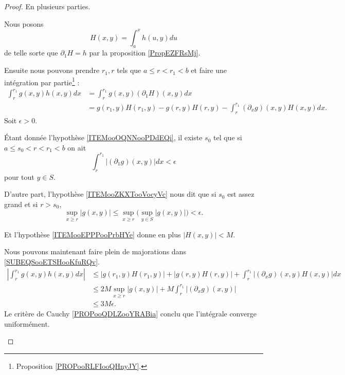 \begin{proof}
	En plusieurs parties.
	\begin{subproof}
		\spitem[La fonction \( H\)]
		Nous posons
		\begin{equation}
			H(x,y)=\int_{a}^xh(u,y)du
		\end{equation}
		de telle sorte que \( \partial_1H=h\) par la proposition \ref{PropEZFRsMj}.

		Ensuite nous pouvons prendre \( r_1,r\) tels que \( a\leq r<r_1<b\) et faire une intégration par partie\footnote{Proposition \ref{PROPooRLFIooQHnyJY}.} :
		\begin{subequations}		\label{SUBEQSooETSHooKfuRQv}
			\begin{align}
				\int_r^{r_1}g(x,y)h(x,y)dx & =\int_r^{r_1}g(x,y)(\partial_1H)(x,y)dx                                \\
				                           & =g(r_1,y)H(r_1,y)-g(r,y)H(r,y)-\int_r^{r_1}(\partial_xg)(x,y)H(x,y)dx.
			\end{align}
		\end{subequations}
		Soit \( \epsilon>0\).

		Étant donnée l'hypothèse \ref{ITEMooOQNNooPDdEQi}, il existe \( s_0\) tel que si \( a\leq s_0<r<r_1<b\) on ait
		\begin{equation}
			\int_r^{r_1}| (\partial_1g)(x,y) |dx<\epsilon
		\end{equation}
		pour tout \( y\in S\).

		D'autre part, l'hypothèse \ref{ITEMooZKXTooVocyVc} nous dit que si \( s_0\) est assez grand et si \( r>s_0\),
		\begin{equation}
			\sup_{x\geq r}| g(x,y) |\leq \sup_{x\geq r}\big( \sup_{y\in S}| g(x,y) | \big)<\epsilon.
		\end{equation}

		Et l'hypothèse \ref{ITEMooEPPPooPrbHYe} donne en plus \( | H(x,y) |<M\).

		Nous pouvons maintenant faire plein de majorations dans \eqref{SUBEQSooETSHooKfuRQv}.
		\begin{subequations}
			\begin{align}
				|\int_r^{r_1}g(x,y)h(x,y)dx| & \leq |g(r_1,y)H(r_1,y)|+|g(r,y)H(r,y)|+ \int_r^{r_1}|(\partial_xg)(x,y)H(x,y)|dx \\
				                             & \leq 2M\sup_{x\geq r}| g(x,y) |+M\int_r^{r_1}| (\partial_xg)(x,y) |              \\
				                             & \leq 3M\epsilon.
			\end{align}
		\end{subequations}
		\spitem[Conclusion]
		Le critère de Cauchy \ref{PROPooQDLZooYRABia} conclu que l'intégrale converge uniformément.
	\end{subproof}
\end{proof}

